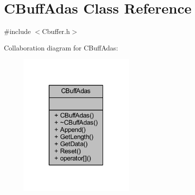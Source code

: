 \hypertarget{class_c_buff_adas}{}\section{C\+Buff\+Adas Class Reference}
\label{class_c_buff_adas}


{\ttfamily \#include $<$Cbuffer.\+h$>$}



Collaboration diagram for C\+Buff\+Adas\+:
\nopagebreak
\begin{figure}[H]
\begin{center}
\leavevmode
\includegraphics[width=163pt]{class_c_buff_adas__coll__graph}
\end{center}
\end{figure}

